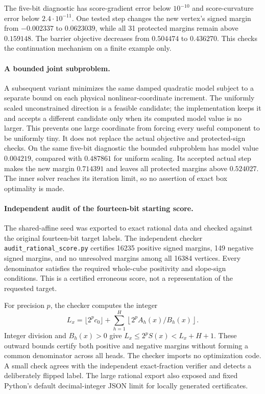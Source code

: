\documentclass[11pt]{article}
\begin{document}
The five-bit diagnostic has score-gradient error below $10^{-10}$ and
score-curvature error below $2.4\cdot10^{-11}$. One tested step changes
the new vertex's signed margin from $-0.002337$ to $0.0623039$, while
all 31 protected margins remain above $0.159148$. The barrier objective
decreases from $0.504474$ to $0.436270$. This checks the continuation
mechanism on a finite example only.



\paragraph{A bounded joint subproblem.}
A subsequent variant minimizes the same damped quadratic model subject
to a separate bound on each physical nonlinear-coordinate increment.
The uniformly scaled unconstrained direction is a feasible candidate;
the implementation keeps it and accepts a different candidate only when
its computed model value is no larger. This prevents one large coordinate
from forcing every useful component to be uniformly tiny. It does not
replace the actual objective and protected-sign checks.
On the same five-bit diagnostic the bounded subproblem has model value
$0.004219$, compared with $0.487861$ for uniform scaling. Its accepted
actual step makes the new margin $0.714391$ and leaves all protected
margins above $0.524027$. The inner solver reaches its iteration limit,
so no assertion of exact box optimality is made.

\paragraph{Independent audit of the fourteen-bit starting score.}
The shared-affine seed was exported to exact rational data and checked
against the original fourteen-bit target labels. The independent checker
\texttt{audit\_rational\_score.py} certifies 16235 positive signed margins,
149 negative signed margins, and no unresolved margins among all 16384
vertices. Every denominator satisfies the required whole-cube positivity
and slope-sign conditions. This is a certified erroneous score, not a
representation of the requested target.

For precision $p$, the checker computes the integer
\[
 L_x=\lfloor2^pc_0\rfloor+
       \sum_{h=1}^H\left\lfloor2^pA_h(x)/B_h(x)\right\rfloor.
\]
Integer division and $B_h(x)>0$ give
$L_x\le2^pS(x)<L_x+H+1$. These outward bounds certify both positive
and negative margins without forming a common denominator across all
heads. The checker imports no optimization code. A small check agrees
with the independent exact-fraction verifier and detects a deliberately
flipped label. The large rational export also exposed and fixed Python's
default decimal-integer JSON limit for locally generated certificates.
\end{document}
